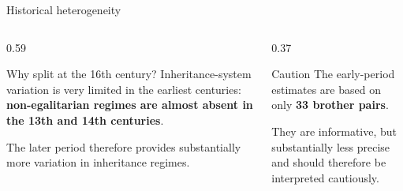 \documentclass[aspectratio=169,10pt]{beamer}
\begin{document}
\begin{frame}{Historical heterogeneity}
\begin{columns}[T,onlytextwidth]
\begin{column}{0.59\textwidth}

\begin{alertblock}{Why split at the 16th century?}
\scriptsize
Inheritance-system variation is very limited in the earliest centuries:
\textbf{non-egalitarian regimes are almost absent in the 13th and 14th centuries}.

The later period therefore provides substantially more variation
in inheritance regimes.
\end{alertblock}

\end{column}

\begin{column}{0.37\textwidth}

\begin{alertblock}{Caution}
\scriptsize
The early-period estimates are based on only
\textbf{33 brother pairs}.

They are informative, but substantially less precise and should
therefore be interpreted cautiously.
\end{alertblock}

\end{column}

\end{columns}

\end{frame}
\end{document}
